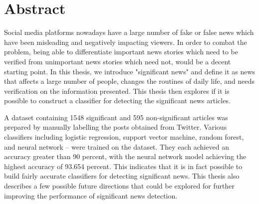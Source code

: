 \chapter*{Abstract}
\makeabstract

Social media platforms nowadays have a large number of fake or false news which have been misleading and negatively impacting viewers. In order to combat the problem, being able to differentiate important news stories which need to be verified from unimportant news stories which need not, would be a decent starting point. In this thesis, we introduce "significant news" and define it as news that affects a large number of people, changes the routines of daily life, and needs verification on the information presented. This thesis then explores if it is possible to construct a classifier for detecting the significant news articles.

A dataset containing 1548 significant and 595 non-significant articles was prepared by manually labelling the posts obtained from Twitter. Various classifiers including logistic regression, support vector machine, random forest, and neural network -- were trained on the dataset. They each achieved an accuracy greater than 90 percent, with the neural network model achieving the highest accuracy of 93.654 percent. This indicates that it is in fact possible to build fairly accurate classifiers for detecting significant news. This thesis also describes a few possible future directions that could be explored for further improving the performance of significant news detection.


\abstractsig
